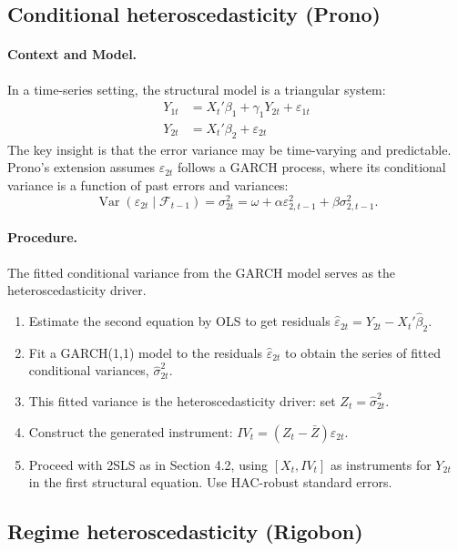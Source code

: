 \documentclass{article}
\newcommand{\var}{\operatorname{Var}}
\theoremstyle{plain}
\begin{document}
\subsection{Conditional heteroscedasticity (Prono)}
\paragraph{Context and Model.} In a time-series setting, the structural model is a triangular system:
\begin{align*}
    Y_{1t} &= X_t'\beta_1 + \gamma_1 Y_{2t} + \varepsilon_{1t} \\
    Y_{2t} &= X_t'\beta_2 + \varepsilon_{2t}
\end{align*}
The key insight is that the error variance may be time-varying and predictable. Prono's extension assumes \(\varepsilon_{2t}\) follows a GARCH process, where its conditional variance is a function of past errors and variances:
\[
\var(\varepsilon_{2t}\mid\mathcal{F}_{t-1}) = \sigma_{2t}^2 = \omega + \alpha \varepsilon_{2,t-1}^2 + \beta \sigma_{2,t-1}^2.
\]

\paragraph{Procedure.} The fitted conditional variance from the GARCH model serves as the heteroscedasticity driver.
\begin{enumerate}\itemsep2pt
    \item Estimate the second equation by OLS to get residuals \(\hat\varepsilon_{2t} = Y_{2t} - X_t'\hat\beta_2\).
    \item Fit a GARCH(1,1) model to the residuals \(\hat\varepsilon_{2t}\) to obtain the series of fitted conditional variances, \(\hat\sigma_{2t}^2\).
    \item This fitted variance is the heteroscedasticity driver: set \(Z_t = \hat\sigma_{2t}^2\).
    \item Construct the generated instrument: \(IV_t = (Z_t - \bar{Z})\hat\varepsilon_{2t}\).
    \item Proceed with 2SLS as in Section 4.2, using \([X_t, IV_t]\) as instruments for \(Y_{2t}\) in the first structural equation. Use HAC-robust standard errors.
\end{enumerate}

\subsection{Regime heteroscedasticity (Rigobon)}
\end{document}
